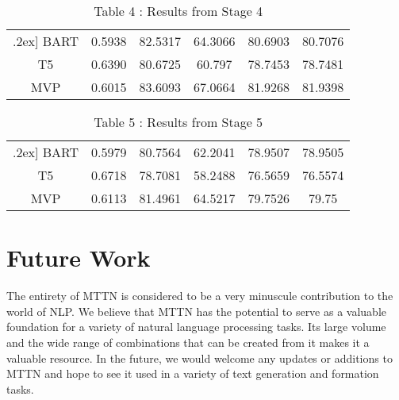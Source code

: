 \documentclass{article}
\begin{document}
\begin{center}
\begin{table}[h]
\vspace{0.4cm} 
\hspace*{3cm}\begin{tabular}{c c c c c c} 
\\
\hline \0.2ex]
 BART & 0.5938 & 82.5317 & 64.3066 & 80.6903 & 80.7076\\ 
 [1ex] 

 T5 & 0.6390 & 80.6725 & 60.797 & 78.7453 & 78.7481 \\
 [1ex] 

 MVP & 0.6015 & 83.6093 & 67.0664 & 81.9268 & 81.9398\\
 [1ex] 
 \hline
\end{tabular}
\caption{Table 4 : Results from Stage 4}
 \end{table}
\end{center}


\begin{center}
\begin{table}[h!]
\vspace{0.4cm} 
\hspace*{3cm}\begin{tabular}{c c c c c c} 
\\
\hline \0.2ex]
 BART & 0.5979 & 80.7564 & 62.2041 & 78.9507 & 78.9505\\ 
 [1ex] 

 T5 & 0.6718 & 78.7081 & 58.2488 & 76.5659 & 76.5574\\
 [1ex] 

 MVP & 0.6113 & 81.4961 & 64.5217 & 79.7526 & 79.75 \\
 [1ex] 
 \hline
\end{tabular}
\caption{Table 5 : Results from Stage 5}
 \end{table}
\end{center}

\newpage

\section{Future Work}

The entirety of MTTN is considered to be a very minuscule contribution to the world of NLP. We believe that MTTN has the potential to serve as a valuable foundation for a variety of natural language processing tasks. Its large volume and the wide range of combinations that can be created from it makes it a valuable resource. In the future, we would welcome any updates or additions to MTTN and hope to see it used in a variety of text generation and formation tasks.
\end{document}
